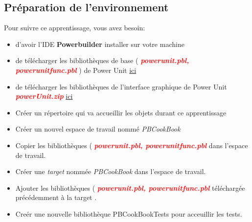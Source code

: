 \documentclass[a4paper,11pt,french]{report}
\theoremstyle{definition}
\begin{document}
\subsection{Préparation de l'environnement}
Pour suivre ce apprentissage, vous avez besoin:
\begin{itemize}
    \item d'avoir l'IDE \textbf{Powerbuilder} installer sur votre machine
    \item de télécharger les bibliothèques de base ( \textcolor{red}{\textbf{\textit{powerunit.pbl, powerunitfunc.pbl}}} ) de  Power Unit  \href{https://github.com/mahugnon/PBUnitBase.git}{ ici} 
    \item de télécharger les bibliothèques de l'interface graphique de Power Unit  \textcolor{red}{\textbf{\textit{powerUnit.zip}}}  \href{https://github.com/mahugnon/PowerUnitHonore/releases/download/v3.1.2/powerUnit.zip}{ici} 
    \item Créer un répertoire qui va accueillir les objets durant ce apprentissage  
    \item Créer un nouvel espace de travail nommé \textit{PBCookBook} 
    \item Copier les bibliothèques ( \textcolor{red}{\textbf{\textit{powerunit.pbl, powerunitfunc.pbl}}}  dans l'espace de travail.
    \item Créer une \textit{target} nommée \textit{PBCookBook} dans l'espace de travail.
    \item Ajouter les bibliothèques ( \textcolor{red}{\textbf{\textit{powerunit.pbl, powerunitfunc.pbl}}}  téléchargée précédemment à la target  .
    \item  Creér une nouvelle bibliothèque PBCookBookTests pour acceuillir les tests.
\end{itemize}

\end{document}
